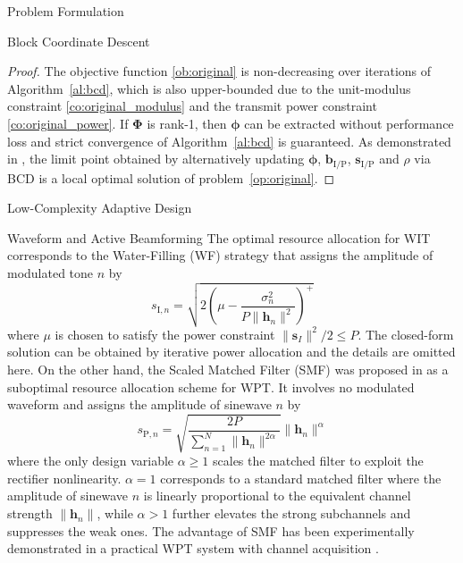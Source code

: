 \documentclass[journal]{IEEEtran}
\begin{document}
\begin{section}{Problem Formulation}
\begin{subsection}{Block Coordinate Descent}
			\begin{proof}\label{pf:bcd}
				The objective function \eqref{ob:original} is non-decreasing over iterations of Algorithm~\ref{al:bcd}, which is also upper-bounded due to the unit-modulus constraint \eqref{co:original_modulus} and the transmit power constraint \eqref{co:original_power}. If $\boldsymbol{\Phi}$ is rank-\num{1}, then $\boldsymbol{\phi}$ can be extracted without performance loss and strict convergence of Algorithm~\ref{al:bcd} is guaranteed. As demonstrated in \cite{Grippo2000}, the limit point obtained by alternatively updating $\boldsymbol{\phi}$, $\boldsymbol{b}_{\mathrm{I/P}}$, $\boldsymbol{s}_{\mathrm{I/P}}$ and $\rho$ via BCD is a local optimal solution of problem~\eqref{op:original}.
			\end{proof}
		\end{subsection}


		\begin{subsection}{Low-Complexity Adaptive Design}
			\begin{subsubsection}{Waveform and Active Beamforming}
				The optimal resource allocation for WIT corresponds to the Water-Filling (WF) strategy that assigns the amplitude of modulated tone $n$ by
				\begin{equation}
					s_{\mathrm{I}, n} = \sqrt{2\left(\mu - \frac{\sigma_n^2}{P \lVert{\boldsymbol{h}_n}\rVert^2}\right)^+}
				\end{equation}
				where $\mu$ is chosen to satisfy the power constraint $\lVert{\boldsymbol{s}_I}\rVert^2 / 2 \le P$. The closed-form solution can be obtained by iterative power allocation and the details are omitted here. On the other hand, the Scaled Matched Filter (SMF) was proposed in \cite{Clerckx2017} as a suboptimal resource allocation scheme for WPT. It involves no modulated waveform and assigns the amplitude of sinewave $n$ by
				\begin{equation}
					s_{\mathrm{P}, n} = \sqrt{\frac{2 P}{\sum_{n=1}^N \lVert{\boldsymbol{h}_n \rVert^{2 \alpha}}}}\lVert{\boldsymbol{h}_n}\rVert^\alpha
				\end{equation}
				where the only design variable $\alpha \ge 1$ scales the matched filter to exploit the rectifier nonlinearity. $\alpha = 1$ corresponds to a standard matched filter where the amplitude of sinewave $n$ is linearly proportional to the equivalent channel strength $\lVert{\boldsymbol{h}_n}\rVert$, while $\alpha > 1$ further elevates the strong subchannels and suppresses the weak ones. The advantage of SMF has been experimentally demonstrated in a practical WPT system with channel acquisition \cite{Kim2017}.


\end{subsubsection}
\end{subsection}
\end{section}
\end{document}

